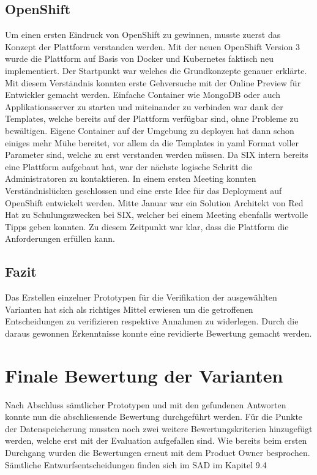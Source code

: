 \subsection{OpenShift}

Um einen ersten Eindruck von OpenShift zu gewinnen, musste zuerst das Konzept der Plattform verstanden werden. Mit der neuen OpenShift Version 3 wurde die Plattform auf Basis von Docker und Kubernetes faktisch neu implementiert. Der Startpunkt war \cite{openshiftintro} welches die Grundkonzepte genauer erklärte. Mit diesem Verständnis konnten erste Gehversuche mit der Online Preview für Entwickler gemacht werden. Einfache Container wie MongoDB oder auch Applikationsserver zu starten und miteinander zu verbinden war dank der Templates, welche bereits auf der Plattform verfügbar sind, ohne Probleme zu bewältigen. Eigene Container auf der Umgebung zu deployen hat dann schon einiges mehr Mühe bereitet, vor allem da die Templates in yaml Format voller Parameter sind, welche zu erst verstanden werden müssen. Da SIX intern bereits eine Plattform aufgebaut hat, war der nächste logische Schritt die Administratoren zu kontaktieren. In einem ersten Meeting konnten Verständnislücken geschlossen und eine erste Idee für das Deployment auf OpenShift entwickelt werden. Mitte Januar war ein Solution Architekt von Red Hat zu Schulungszwecken bei SIX, welcher bei einem Meeting ebenfalls wertvolle Tipps geben konnten. Zu diesem Zeitpunkt war klar, dass die Plattform die Anforderungen erfüllen kann.

\subsection{Fazit}

Das Erstellen einzelner Prototypen für die Verifikation der ausgewählten Varianten hat sich als richtiges Mittel erwiesen um die getroffenen Entscheidungen zu verifizieren respektive Annahmen zu widerlegen. Durch die daraus gewonnen Erkenntnisse konnte eine revidierte Bewertung gemacht werden.

\newpage

\section{Finale Bewertung der Varianten}

Nach Abschluss sämtlicher Prototypen und mit den gefundenen Antworten konnte nun die abschliessende Bewertung durchgeführt werden. Für die Punkte der Datenspeicherung mussten noch zwei weitere Bewertungskriterien hinzugefügt werden, welche erst mit der Evaluation aufgefallen sind. Wie bereits beim ersten Durchgang wurden die Bewertungen erneut mit dem Product Owner besprochen. Sämtliche Entwurfsentscheidungen finden sich im SAD im Kapitel 9.4

